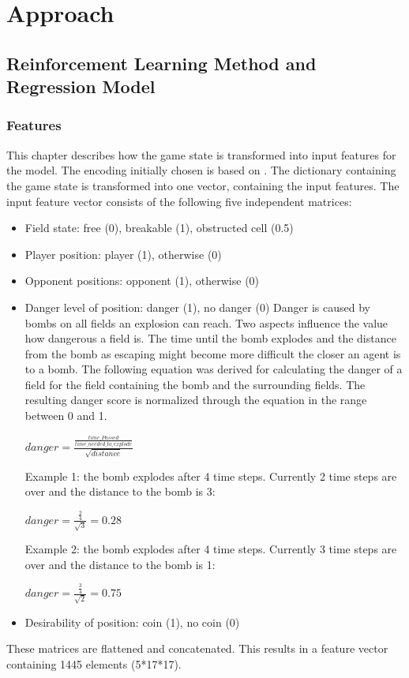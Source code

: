 \section{Approach} 
\label{approach}

\subsection{Reinforcement Learning Method and Regression Model} 
\label{ch:approachA}


\subsubsection{Features}
\label{ch:approachAa}

This chapter describes how the game state is transformed into input features for the model. 
The encoding initially chosen is based on \cite{Kormelink2018}. The dictionary containing the game state is transformed into one vector, containing the input features.
The input feature vector consists of the following five independent matrices:
\begin{itemize}
	\item Field state: free (0), breakable (1), obstructed cell (0.5)
	\item Player position: player (1), otherwise (0)
	\item Opponent positions: opponent (1), otherwise (0)
	\item Danger level of position: danger (1), no danger (0) \newline
	Danger is caused by bombs on all fields an explosion can reach. Two aspects influence the value how dangerous a field is. The time until the bomb explodes and the distance from the bomb as escaping might become more difficult the closer an agent is to a bomb. The following equation was derived for calculating the danger of a field for the field containing the bomb and the surrounding fields. The resulting danger score is normalized through the equation in the range between 0 and 1.
	
	$ danger = \frac{\frac{time\_Passed}{time\_needed\_to\_explode}}{\sqrt{distance}} $
	
	Example 1: the bomb explodes after 4 time steps. Currently 2 time steps are over and the distance to the bomb is 3:
	
	$ danger = \frac{\frac{2}{4}}{\sqrt{3}} = 0.28 $
	
	Example 2: the bomb explodes after 4 time steps. Currently 3 time steps are over and the distance to the bomb is 1:
	
	$ danger = \frac{\frac{3}{4}}{\sqrt{2}} = 0.75 $
	
	\item Desirability of position: coin (1), no coin (0)
\end{itemize}
These matrices are flattened and concatenated. This results in a feature vector containing 1445 elements (5*17*17).

